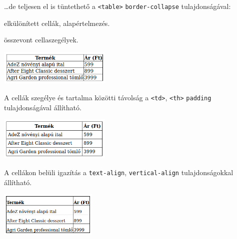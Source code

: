 \begin{frame}
  \dots de teljesen el is tüntethető a \texttt{<table>} \texttt{border-collapse} tulajdonságával:
  \begin{description}[m]
    \item[\texttt{separate}] elkülönített cellák, alapértelmezés.
    \item[\texttt{collapse}] összevont cellaszegélyek.
  \end{description}
  \vfill
  \begin{exampleblock}{}
    
  \end{exampleblock}
  \begin{center}
    \includegraphics[width=0.4\textwidth]{tablazat06.png}
  \end{center}
\end{frame}

\begin{frame}
  A cellák szegélye és tartalma közötti távolság a \texttt{<td>}, \texttt{<th>} \texttt{padding} tulajdonságával állítható.
  \begin{exampleblock}{}
    \footnotesize
    
  \end{exampleblock}
  \begin{center}
    \includegraphics[width=0.4\textwidth]{tablazat07.png}
  \end{center}
\end{frame}

\begin{frame}
  A cellákon belüli igazítás a \texttt{text-align}, \texttt{vertical-align} tulajdonságokkal állítható.
  \begin{exampleblock}{}
    \scriptsize
    
  \end{exampleblock}
  \begin{center}
    \includegraphics[width=0.35\textwidth]{tablazat08.png}
  \end{center}
\end{frame}

